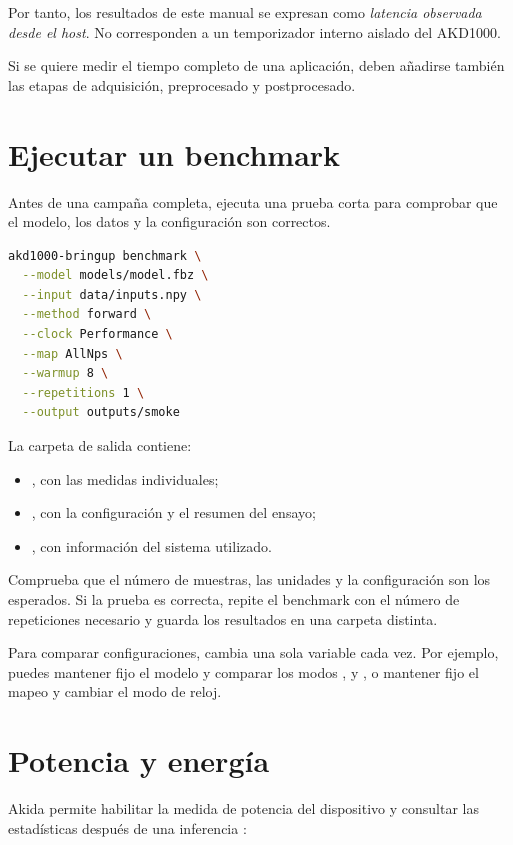 Por tanto, los resultados de este manual se expresan como
\emph{latencia observada desde el host}. No corresponden a un temporizador interno aislado
del AKD1000.

Si se quiere medir el tiempo completo de una aplicación, deben añadirse también las etapas
de adquisición, preprocesado y postprocesado.

\section{Ejecutar un benchmark}

Antes de una campaña completa, ejecuta una prueba corta para comprobar que el
modelo, los datos y la configuración son correctos.

\begin{lstlisting}[language=bash]
akd1000-bringup benchmark \
  --model models/model.fbz \
  --input data/inputs.npy \
  --method forward \
  --clock Performance \
  --map AllNps \
  --warmup 8 \
  --repetitions 1 \
  --output outputs/smoke
\end{lstlisting}

La carpeta de salida contiene:

\begin{itemize}
  \item {}, con las medidas individuales;
  \item {}, con la configuración y el resumen del ensayo;
  \item \code{host.json}, con información del sistema utilizado.
\end{itemize}

Comprueba que el número de muestras, las unidades y la configuración son los esperados.
Si la prueba es correcta, repite el benchmark con el número de repeticiones necesario y
guarda los resultados en una carpeta distinta.

Para comparar configuraciones, cambia una sola variable cada vez. Por ejemplo, puedes
mantener fijo el modelo y comparar los modos \code{AllNps},  y ,
o mantener fijo el mapeo y cambiar el modo de reloj.

\section{Potencia y energía}

Akida permite habilitar la medida de potencia del dispositivo y consultar las estadísticas
después de una inferencia \cite{brainchip_akida_guide}:

